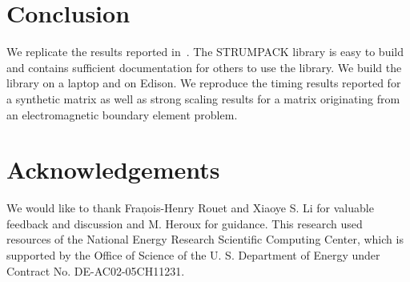 \documentclass{acmsmall}
\begin{document}
\section{Conclusion}

We replicate the results reported in~\cite{rouet:strumpack}.  The
STRUMPACK library is easy to build and contains sufficient
documentation for others to use the library.  We build the
library on a laptop and on Edison.  We reproduce the timing
results reported for a synthetic matrix as well as strong scaling
results for a matrix originating from an electromagnetic boundary
element problem.


\section{Acknowledgements}

We would like to thank Fran\c{}ois-Henry Rouet and Xiaoye S. Li
for valuable feedback and discussion and M. Heroux for guidance.
This research used resources of the National Energy Research
Scientific Computing Center, which is supported by the Office of
Science of the U. S. Department of Energy under Contract
No. DE-AC02-05CH11231.



\end{document}
